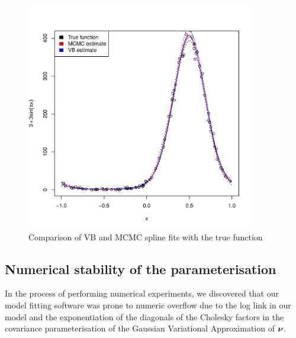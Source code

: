 					
			\begin{figure}
				\label{fig:spline}
				\caption{Comparison of VB and MCMC spline fits with the true function}
				\includegraphics[width=0.95 \textwidth, height=100mm]{code/results/accuracy_plots_spline_gva2.pdf}
			\end{figure}
					
					
			\subsection{Numerical stability of the parameterisation}
			
			In the process of performing numerical experiments, we discovered that our model fitting software was 
			prone to numeric overflow due to the log link in our model and the exponentiation of the diagonals of the
			Cholesky factors in the covariance parameterisation of the Gaussian Variational Approximation of ${\boldsymbol \nu}$.
			
